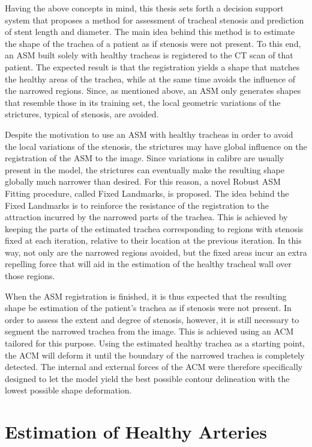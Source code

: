\documentclass{article}
\begin{document}
Having the above concepts in mind, this thesis sets forth a decision support
system that proposes a method for assessment of tracheal stenosis and
prediction of stent length and diameter. The main idea behind this method
is to estimate the shape of the trachea of a patient as if stenosis were not
present. To this end, an ASM built solely with healthy tracheas is registered
to the CT scan of that patient. The expected result is that the registration
yields a shape that matches the healthy areas of the trachea, while at the
same time avoids the influence of the narrowed regions. Since, as mentioned
above, an ASM only generates shapes that resemble those in its training
set, the local geometric variations of the strictures, typical of stenosis, are
avoided.

Despite the motivation to use an ASM with healthy tracheas in order
to avoid the local variations of the stenosis, the strictures may have global
influence on the registration of the ASM to the image. Since variations in
calibre are usually present in the model, the strictures can eventually make
the resulting shape globally much narrower than desired. For this reason, a
novel Robust ASM Fitting procedure, called Fixed Landmarks, is proposed.
The idea behind the Fixed Landmarks is to reinforce the resistance of the
registration to the attraction incurred by the narrowed parts of the trachea.
This is achieved by keeping the parts of the estimated trachea corresponding
to regions with stenosis fixed at each iteration, relative to their location
at the previous iteration. In this way, not only are the narrowed regions
avoided, but the fixed areas incur an extra repelling force that will aid in
the estimation of the healthy tracheal wall over those regions.

When the ASM registration is finished, it is thus expected that the
resulting shape be estimation of the patient’s trachea as if stenosis were
not present. In order to assess the extent and degree of stenosis, however,
it is still necessary to segment the narrowed trachea from the image.
This is achieved using an ACM tailored for this purpose. Using the estimated
healthy trachea as a starting point, the ACM will deform it until the
boundary of the narrowed trachea is completely detected. The internal and
external forces of the ACM were therefore specifically designed to let the
model yield the best possible contour delineation with the lowest possible
shape deformation.
\section{Estimation of Healthy Arteries}
\end{document}
